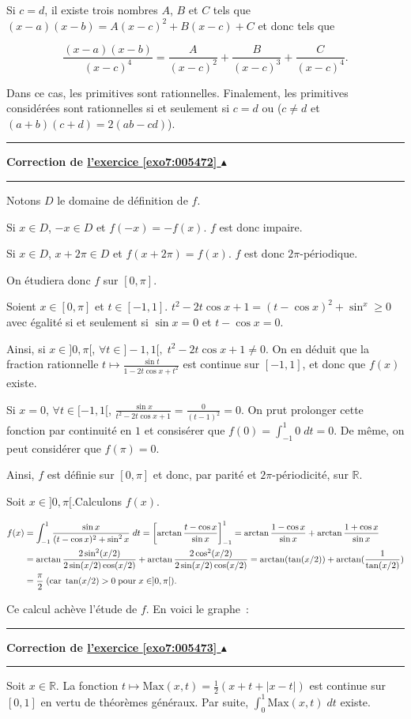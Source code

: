\documentclass[11pt,a4paper]{article}
\newcommand{\Rr}{\mathbb{R}} \newcommand{\R}{\mathbb{R}}
\newcommand{\Arctan}{\mathop{\mathrm{arctan}}\nolimits}
\newcounter{exo}
\newcommand{\correction}[1]{\hypertarget{cor7:#1}{}\label{cor7:#1}{\bf Correction de \hyperlink{exo7:#1}{l'exercice \ref{exo7:#1} $\blacktriangle$}}\vspace{1mm}\hrule\vspace{1mm}}
\newcommand{\fincorrection}{\vspace{1mm}\hrule\vspace*{7mm}}
\begin{document}
Si $c=d$, il existe trois nombres $A$, $B$ et $C$ tels que $(x-a)(x-b)=A(x-c)^2+B(x-c)+C$ et donc tels que

$$\frac{(x-a)(x-b)}{(x-c)^4}=\frac{A}{(x-c)^2}+\frac{B}{(x-c)^3}+\frac{C}{(x-c)^4}.$$

Dans ce cas, les primitives sont rationnelles. Finalement, les primitives considérées sont rationnelles si et seulement si $c=d$ ou ($c\neq d$ et $(a+b)(c+d)=2(ab-cd)$).
\fincorrection
\correction{005472}
Notons $D$ le domaine de définition de $f$.

Si $x\in D$, $-x\in D$ et $f(-x)=-f(x)$. $f$ est donc impaire.

Si $x\in D$, $x+2\pi\in D$ et $f(x+2\pi)=f(x)$. $f$ est donc $2\pi$-périodique.

On étudiera donc $f$ sur $[0,\pi]$.

Soient $x\in[0,\pi]$ et $t\in[-1,1]$. $t^2-2t\cos x+1=(t-\cos x)^2+\sin^x\geq0$ avec égalité si et seulement si $\sin x=0$ et $t-\cos x=0$.

Ainsi, si $x\in]0,\pi[$, $\forall t\in]-1,1[,\;t^2-2t\cos x+1\neq0$. On en déduit que la fraction rationnelle $t\mapsto
\frac{\sin t}{1-2t\cos x+t^2}$ est continue sur $[-1,1]$, et donc que $f(x)$ existe.

Si $x=0$, $\forall t\in[-1,1[$, $\frac{\sin x}{t^2-2t\cos x+1}=\frac{0}{(t-1)^2}=0$. On prut prolonger cette fonction par continuité en $1$ et consisérer que $f(0)=\int_{-1}^{1}0\;dt=0$. De même, on peut considérer que $f(\pi)=0$.

Ainsi, $f$ est définie sur $[0,\pi]$ et donc, par parité et $2\pi$-périodicité, sur $\Rr$.

Soit $x\in]0,\pi[$.Calculons $f(x)$.

\begin{align*}\ensuremath
f(x)&=\int_{-1}^{1}\frac{\sin x}{(t-\cos x)^2+\sin^2x}\;dt=\left[\Arctan\frac{t-\cos x}{\sin x}\right]_{-1}^{1}
=\Arctan\frac{1-\cos x}{\sin x}+\Arctan\frac{1+\cos x}{\sin x}\\
 &=\Arctan\frac{2\sin^2(x/2)}{2\sin(x/2)\cos(x/2)}+\Arctan\frac{2\cos^2(x/2)}{2\sin(x/2)\cos(x/2)}
=\Arctan(\tan(x/2))+\Arctan(\frac{1}{\tan(x/2)})\\
 &=\frac{\pi}{2}\;(\mbox{car}\;\tan(x/2)>0\;\mbox{pour}\;x\in]0,\pi[).
\end{align*}

Ce calcul achève l'étude de $f$. En voici le graphe~:


\fincorrection
\correction{005473}
Soit $x\in\Rr$. La fonction $t\mapsto\mbox{Max}(x,t)=\frac{1}{2}(x+t+|x-t|)$ est continue sur $[0,1]$ en vertu de théorèmes généraux. Par suite, $\int_{0}^{1}\mbox{Max}(x,t)\;dt$ existe. 
\end{document}
